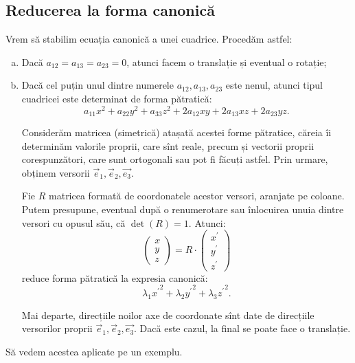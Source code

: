 \documentclass[11pt,a4paper]{article}
\theoremstyle{dotless}
\theoremstyle{dotlessdr}
\begin{document}
\subsection{Reducerea la forma canonică}

\indent\indent Vrem să stabilim ecuația canonică a unei cuadrice. Procedăm
astfel:
\begin{enumerate}[(a)]
	\item Dacă $a_{12} = a_{13} = a_{23} = 0$, atunci facem o translație și
eventual o rotație;
    \item Dacă cel puțin unul dintre numerele $a_{12}, a_{13}, a_{23}$ este
nenul, atunci tipul cuadricei este determinat de forma pătratică: 
 \[
	a_{11} x^2 + a_{22} y^2 + a_{33} z^2 + 2a_{12} xy + 2a_{13} xz + 2a_{23}yz.
\]

Considerăm matricea (simetrică) atașată acestei forme pătratice, căreia îi
determinăm valorile proprii, care sînt reale, precum și vectorii proprii
corespunzători, care sunt ortogonali sau pot fi făcuți astfel. Prin urmare,
obținem versorii $\vec{e}_1, \vec{e}_2, \vec{e_3}$.

Fie $R$ matricea formată de coordonatele acestor versori, aranjate pe coloane.
Putem presupune, eventual după o renumerotare sau înlocuirea unuia dintre 
versori cu opusul său, că $\det(R) = 1$. Atunci: 
 \[
	\begin{pmatrix}
	    x \\ y \\ z
    \end{pmatrix} = R \cdot \begin{pmatrix}
	                            x^{\prime} \\ y^{\prime} \\ z^{\prime}
                            \end{pmatrix}
\]
reduce forma pătratică la expresia canonică: 
 \[
\lambda_1 {x^{\prime}}^2 + \lambda_2 {y^{\prime}}^2 + \lambda_3 {z^{\prime}}^2.
\]

Mai departe, direcțiile noilor axe de coordonate sînt date de direcțiile 
versorilor proprii $\vec{e}_1, \vec{e}_2, \vec{e_3}$. Dacă este cazul, la final
se poate face o translație.
\end{enumerate}

Să vedem acestea aplicate pe un exemplu.
\end{document}
